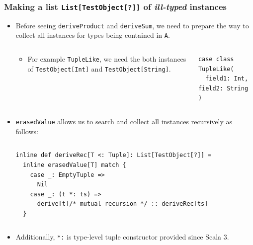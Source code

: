 \begin{frame}[fragile]
  \frametitle{ Making a list \lstinline|List[TestObject[?]]| of \emph{ill-typed} instances}
  
  \begin{itemize}
    \item Before seeing \lstinline|deriveProduct| and \lstinline|deriveSum|,
    we need to prepare the way to collect all instances for types being contained in \lstinline|A|.
    \begin{columns}
      \begin{column}{0.55\textwidth}
        \begin{itemize}
          \item For example \lstinline|TupleLike|, 
          we need the both instances of \lstinline|TestObject[Int]| and \lstinline|TestObject[String]|.
        \end{itemize}
      \end{column}
      \begin{column}{0.35\textwidth}
\begin{lstlisting}[style=scala]
case class TupleLike(
  field1: Int, field2: String
)
\end{lstlisting}
      \end{column}
    \end{columns}

    \pause
    \item \lstinline|erasedValue| allows us to search and collect all instances recursively as follows:
    \begin{columns}
      \begin{column}{0.6\textwidth}
\begin{lstlisting}[style=scala]
inline def deriveRec[T <: Tuple]: List[TestObject[?]] =
  inline erasedValue[T] match {
    case _: EmptyTuple =>
      Nil
    case _: (t *: ts) =>
      derive[t]/* mutual recursion */ :: deriveRec[ts]
  }
\end{lstlisting}
      \end{column}
    \end{columns}

    \pause
    \item Additionally, \lstinline|*:| is type-level tuple constructor
    provided since Scala 3.
  \end{itemize}


\end{frame}
